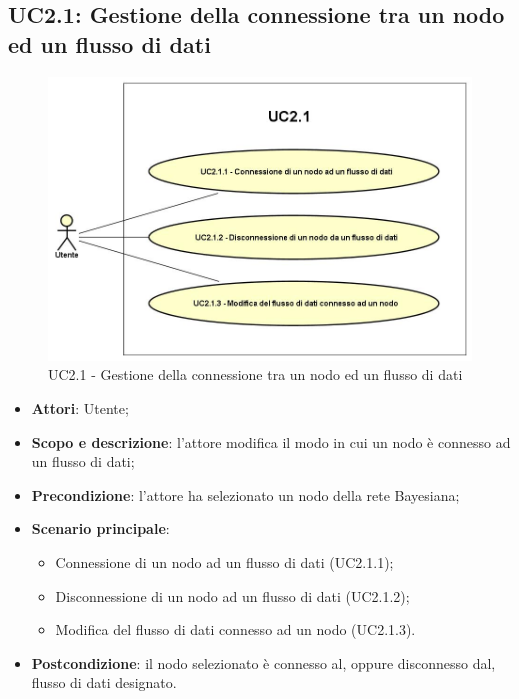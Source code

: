 \subsection{UC2.1: Gestione della connessione tra un nodo ed un flusso di dati}
\hypertarget{UC2.1}{}
\begin{figure} [H]
	\centering
	\includegraphics[scale=0.45]{Img/UC2-1}
	\caption{UC2.1 - Gestione della connessione tra un nodo ed un flusso di dati}\label{}
\end{figure}
\begin{itemize}
	\item \textbf{Attori}: Utente;
	\item \textbf{Scopo e descrizione}: l'attore modifica il modo in cui un nodo è connesso ad un flusso di dati;
	\item \textbf{Precondizione}: l'attore ha selezionato un nodo della rete Bayesiana;
	\item \textbf{Scenario principale}:
	\begin{itemize}
		\item Connessione di un nodo ad un flusso di dati (UC2.1.1);
		\item Disconnessione di un nodo ad un flusso di dati (UC2.1.2);
		\item Modifica del flusso di dati connesso ad un nodo (UC2.1.3).
	\end{itemize}
	\item \textbf{Postcondizione}: il nodo selezionato è connesso al, oppure disconnesso dal, flusso di dati designato.
\end{itemize}

